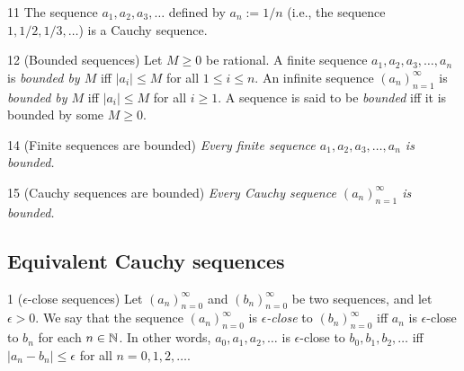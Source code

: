 \begin{proposition}{11}
    \label{harmonic-cauchy}
    The sequence $a_1, a_2, a_3, \ldots$ defined by $a_n := 1/n$ (i.e., the sequence
    $1, 1/2, 1/3, \ldots$) is a Cauchy sequence.
\end{proposition}

\begin{definition}{12}
    \label{rat-bounded-sequence}
    (Bounded sequences) Let $M \geq 0$ be rational. A finite sequence
    $a_1, a_2, a_3, \ldots, a_n$ is \emph{bounded by $M$} iff $|a_i| \leq M$ for
    all $1 \leq i \leq n$. An infinite sequence $(a_n)_{n=1}^{\infty}$ is \emph{bounded
    by $M$} iff $|a_i| \leq M$ for all $i \geq 1$. A sequence is said to be
    \emph{bounded} iff it is bounded by some $M \geq 0$.
\end{definition}

\begin{lemma}{14}
    \label{finite-seq-bounded}
    (Finite sequences are bounded) \emph{Every finite sequence $a_1, a_2, a_3, \ldots, a_n$
    is bounded.}
\end{lemma}

\begin{lemma}{15}
    \label{rat-cauchy-bounded}
    (Cauchy sequences are bounded) \emph{Every Cauchy sequence $(a_n)_{n=1}^{\infty}$
    is bounded.}
\end{lemma}

\subsection{Equivalent Cauchy sequences}
\begin{definition}{1}
    \label{eps-close-seqs}
    ($\epsilon$-close sequences) Let $(a_n)_{n=0}^{\infty}$ and $(b_n)_{n=0}^{\infty}$ be
    two sequences, and let $\epsilon > 0$. We say that the sequence $(a_n)_{n=0}^{\infty}$
    is \emph{$\epsilon$-close} to $(b_n)_{n=0}^{\infty}$ iff $a_n$ is $\epsilon$-close to $b_n$
    for each $n \in \mathbb{N}$. In other words, $a_0, a_1, a_2, \ldots$ is $\epsilon$-close
    to $b_0, b_1, b_2, \ldots$ iff $|a_n - b_n| \leq \epsilon$ for all $n = 0, 1, 2, \ldots$.
\end{definition}

